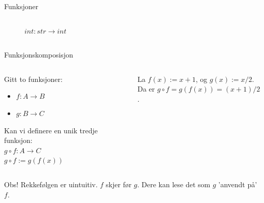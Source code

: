 \begin{frame}{Funksjoner}
\begin{columns}
\begin{column}{0.5\textwidth}
\begin{figure}
               \caption{$int : str \rightarrow int$}
            \end{figure}   
        \end{column}
    \end{columns}
\end{frame}

\begin{frame}{Funksjonskomposisjon}
    \begin{columns}
    \begin{column}{0.38\textwidth}
Gitt to funksjoner:
    \begin{itemize}
        \item $f : A \rightarrow B$
        \item $g : B \rightarrow C$
    \end{itemize}
Kan vi definere en unik tredje funksjon: \\
    $g \circ f : A \rightarrow C$\\
    $g \circ f := g(f(x))$\\
    \pause
    \end{column}
    \begin{column}{0.55\textwidth}
        \centering
        La $f(x) := x+1$, og $g(x) := x/2$.\\
        Da er $g \circ f = g(f(x)) = (x+1)/2$.\\
        \begin{figure}
            \centering
            \qquad
            \label{fig:g o f}
        \end{figure}
    \end{column}
    \end{columns}
    \pause
    Obs! Rekkefølgen er uintuitiv. $f$ skjer før $g$. Dere kan lese det som $g$ 'anvendt på' $f$.
\end{frame}

